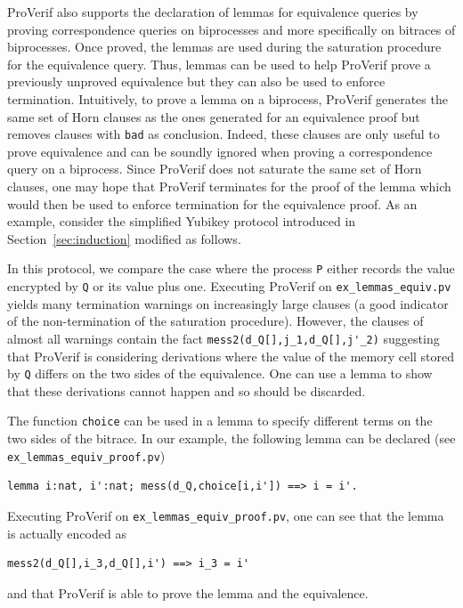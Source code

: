\documentclass{book}
\begin{document}
ProVerif also supports the declaration of lemmas for equivalence queries by proving correspondence queries on biprocesses and more specifically on bitraces of biprocesses. Once proved, the lemmas are used during the saturation procedure for the equivalence query. Thus, lemmas can be used to help ProVerif prove a previously unproved equivalence but they can also be used to enforce termination. Intuitively, to prove a lemma on a biprocess, ProVerif generates the same set of Horn clauses as the ones generated for an equivalence proof but removes clauses with \lstinline!bad! as conclusion. Indeed, these clauses are only useful to prove equivalence and can be soundly ignored when proving a correspondence query on a biprocess. Since ProVerif does not saturate the same set of Horn clauses, one may hope that ProVerif terminates for the proof of the lemma which would then be used to enforce termination for the equivalence proof. As an example, consider the simplified Yubikey protocol introduced in Section~\ref{sec:induction} modified as follows.



In this protocol, we compare the case where the process \lstinline!P! either records the value encrypted by \lstinline!Q! or its value plus one. Executing ProVerif on \texttt{{\docexdir}ex\_lemmas\_equiv.pv} yields many termination warnings on increasingly large clauses (a good indicator of the non-termination of the saturation procedure). However, the clauses of almost all warnings contain the fact \lstinline!mess2(d_Q[],j_1,d_Q[],j'_2)! suggesting that ProVerif is considering derivations where the value of the memory cell stored by \lstinline!Q! differs on the two sides of the equivalence. One can use a lemma to show that these derivations cannot happen and so should be discarded.

The function \lstinline!choice! can be used in a lemma to specify different terms on the two sides of the bitrace. In our example, the following lemma can be declared (see \texttt{{\docexdir}ex\_lemmas\_equiv\_proof.pv})
\begin{lstlisting}[numbers=none]
	lemma i:nat, i':nat; mess(d_Q,choice[i,i']) ==> i = i'.
\end{lstlisting}
Executing ProVerif on \texttt{{\docexdir}ex\_lemmas\_equiv\_proof.pv}, one can see that the lemma is actually encoded as
\begin{lstlisting}[numbers=none]
	mess2(d_Q[],i_3,d_Q[],i') ==> i_3 = i'
\end{lstlisting}
and that ProVerif is able to prove the lemma and the equivalence.
\end{document}
